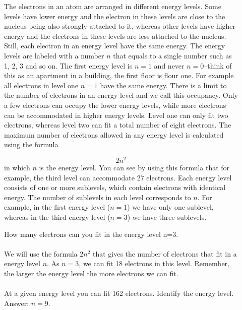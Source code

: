 \documentclass[main.tex]{subfiles}
\begin{document}
\begin{description}
\item[] 
The electrons in an atom are arranged in different energy levels. Some levels have lower energy and the electron in these levels are close to the nucleus being also strongly attached to it, whereas other levels have higher energy and the electrons in these levels are less attached to the nucleus. Still, each electron in an energy level have the same energy. The energy levels are labeled with a number $n$ that equals to a single number such as 1, 2, 3 and so on. The first energy level is $n=1$ and never $n=0$--think of this as an apartment in a building, the first floor is flour one. For example all electrons in level one $n=1$ have the same energy. There is a limit to the number of electrons in an energy level and we call this occupancy. Only a few electrons can occupy the lower energy levels, while more electrons can be accommodated in higher energy levels.  Level one can only fit two electrons, whereas level two can fit a total number of eight electrons. The maximum number of electrons allowed in any energy level is calculated using the formula 

 
\begin{equation}
2n^2 
\end{equation}
in which $n$ is the energy level. You can see by using this formula that for example, the third level can accommodate 27 electrons.
Each energy level consists of one or more sublevels, which contain electrons with identical energy. The number of sublevels in each level corresponds to $n$. For example, in the first energy level ($n=1$) we have only one sublevel, whereas in the third energy level ($n=3$) we have three sublevels.


\begin{example} %
How many electrons can you fit in the energy level n=3.\\
\textlcsc{ \textcolor{dgreen}{\Large Solution} }\\
We will use the formula $2n^2 $ that gives the number of electrons that fit in a energy level $n$. As $n=3$, we can fit 18 electrons in this level. Remember, the larger the energy level the more electrons we can fit. \\
\faDiamond\ \\At a given energy level you can fit 162 electrons. Identify the energy level.
\flushright Answer: $n=9$. 
\end{example}%



\end{description}
\end{document}
